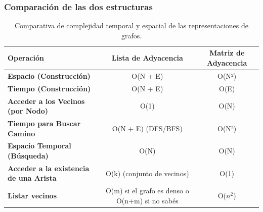 \documentclass[10pt,a4paper]{article}
\begin{document}
\subsubsection*{Comparación de las dos estructuras}
\begin{table}[h!]
    \centering
    \begin{tabular}{|l|c|c|}
    \hline
    \textbf{Operación}                        & \textbf{Lista de Adyacencia}          & \textbf{Matriz de Adyacencia}      \\ \hline
    \textbf{Espacio (Construcción)}           & O(N + E)                             & O(N²)                              \\ \hline
    \textbf{Tiempo (Construcción)}            & O(N + E)                             & O(E)                               \\ \hline
    \textbf{Acceder a los Vecinos (por Nodo)} & O(1)                                 & O(N)                               \\ \hline
    \textbf{Tiempo para Buscar Camino}        & O(N + E) (DFS/BFS)                   & O(N²)                              \\ \hline
    \textbf{Espacio Temporal (Búsqueda)}      & O(N)                                 & O(N)                               \\ \hline
    \textbf{Acceder a la existencia de una Arista} & O(k) (conjunto de vecinos)    & O(1)                               \\ \hline
    \textbf{Listar vecinos} & O(m) si el grafo es denso o O(n+m) si no sabés    & O($n^2$)   \\ \hline
    \end{tabular}
    \caption{Comparativa de complejidad temporal y espacial de las representaciones de grafos.}
\end{table}
\end{document}
